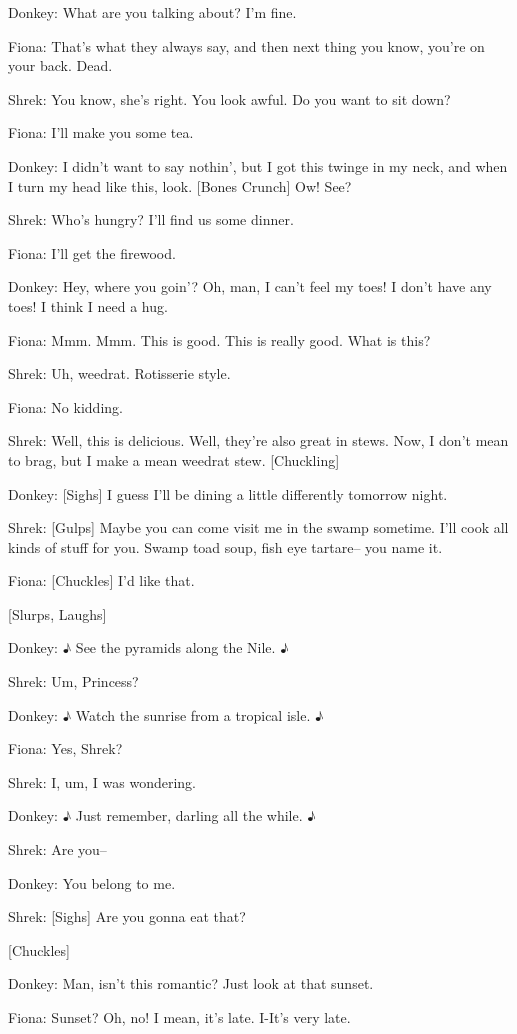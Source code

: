 \documentclass{article}
\begin{document}
Donkey:
What are you talking about? I'm fine.

Fiona:
That's what they always say, and then next thing you know, you're on your back. Dead.

Shrek:
You know, she's right. You look awful. Do you want to sit down?

Fiona:
I'll make you some tea.

Donkey:
I didn't want to say nothin', but I got this twinge in my neck, and when I turn my head like this, look. [Bones Crunch] Ow! See?

Shrek:
Who's hungry? I'll find us some dinner.

Fiona:
I'll get the firewood.

Donkey:
Hey, where you goin'? Oh, man, I can't feel my toes! I don't have any toes! I think I need a hug.

Fiona:
Mmm. Mmm. This is good. This is really good. What is this?

Shrek:
Uh, weedrat. Rotisserie style.

Fiona:
No kidding.

Shrek:
Well, this is delicious. Well, they're also great in stews. Now, I don't mean to brag, but I make a mean weedrat stew. [Chuckling]

Donkey:
[Sighs] I guess I'll be dining a little differently tomorrow night.

Shrek:
[Gulps] Maybe you can come visit me in the swamp sometime. I'll cook all kinds of stuff for you. Swamp toad soup, fish eye tartare-- you name it.

Fiona:
[Chuckles] I'd like that.

[Slurps, Laughs]

Donkey:
♪ See the pyramids along the Nile. ♪

Shrek:
Um, Princess?

Donkey:
♪ Watch the sunrise from a tropical isle. ♪

Fiona:
Yes, Shrek?

Shrek:
I, um, I was wondering.

Donkey:
♪ Just remember, darling all the while. ♪

Shrek:
Are you--

Donkey:
You belong to me.

Shrek:
[Sighs] Are you gonna eat that?

[Chuckles]

Donkey:
Man, isn't this romantic? Just look at that sunset.

Fiona:
Sunset? Oh, no! I mean, it's late. I-It's very late.
\end{document}
